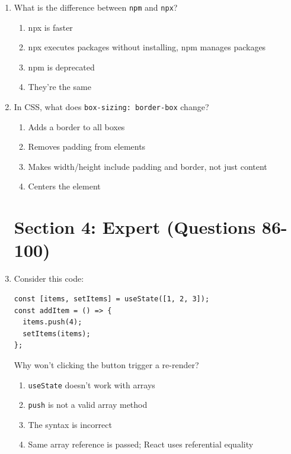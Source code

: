 \documentclass[12pt,a4paper]{article}
\begin{document}
\begin{enumerate}
\item What is the difference between \texttt{npm} and \texttt{npx}?
\begin{enumerate}[label=\Alph*)]
    \item npx is faster
    \item npx executes packages without installing, npm manages packages
    \item npm is deprecated
    \item They're the same
\end{enumerate}

\item In CSS, what does \texttt{box-sizing: border-box} change?
\begin{enumerate}[label=\Alph*)]
    \item Adds a border to all boxes
    \item Removes padding from elements
    \item Makes width/height include padding and border, not just content
    \item Centers the element
\end{enumerate}

\newpage
\section*{\textcolor{hard}{Section 4: Expert (Questions 86-100)}}

\item Consider this code:
\begin{verbatim}
const [items, setItems] = useState([1, 2, 3]);
const addItem = () => {
  items.push(4);
  setItems(items);
};
\end{verbatim}
Why won't clicking the button trigger a re-render?
\begin{enumerate}[label=\Alph*)]
    \item \texttt{useState} doesn't work with arrays
    \item \texttt{push} is not a valid array method
    \item The syntax is incorrect
    \item Same array reference is passed; React uses referential equality
\end{enumerate}


\end{enumerate}
\end{document}
